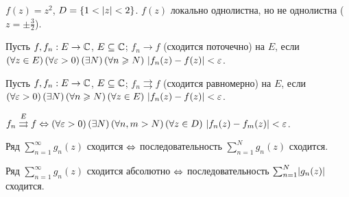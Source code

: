 \begin{example}
	$f(z) = z^2$, $D = \{ 1 < \mathopen{}\left\lvert z\right\rvert\mathclose{} < 2 \}$. $f(z)$ локально однолистна, но не однолистна ($z = \pm \frac{3}{2}$).
\end{example}

\begin{definition}
	Пусть $f, f_n: E \to \mathbb{C}$, $E \subseteq \mathbb{C}$; $f_n \to f$ (сходится поточечно) на $E$, если $(\forall z \in E) \, (\forall \varepsilon > 0) \, (\exists N) \, (\forall n \geqslant N) \,\, \mathopen{}\left\lvert f_n(z) - f(z)\right\rvert\mathclose{} < \varepsilon$. %
\end{definition}

\begin{definition}
	Пусть $f, f_n: E \to \mathbb{C}$, $E \subseteq \mathbb{C}$; $f_n \rightrightarrows f$ (сходится равномерно) на $E$, если $(\forall \varepsilon > 0) \, (\exists N) \, (\forall n \geqslant N) \, (\forall z \in E) \,\, \mathopen{}\left\lvert f_n(z) - f(z)\right\rvert\mathclose{} < \varepsilon$. %
\end{definition}

\begin{theorem} %
	$f_n \overset{E}{\rightrightarrows} f \Leftrightarrow (\forall \varepsilon > 0) \, (\exists N) \, (\forall n, m > N) \, (\forall z \in D) \,\, \mathopen{}\left\lvert f_n(z) - f_m(z)\right\rvert\mathclose{} < \varepsilon$.
\end{theorem}

\begin{definition}
	Ряд $\sum_{n = 1}^\infty g_n(z)$ сходится $\Leftrightarrow$ последовательность $\sum_{n = 1}^N g_n(z)$ сходится. %
\end{definition}

\begin{definition}
	Ряд $\sum_{n = 1}^\infty g_n(z)$ сходится абсолютно $\Leftrightarrow$ последовательность $\sum_{n = 1}^N \mathopen{}\left\lvert g_n(z)\right\rvert\mathclose{}$ сходится. %
\end{definition}

